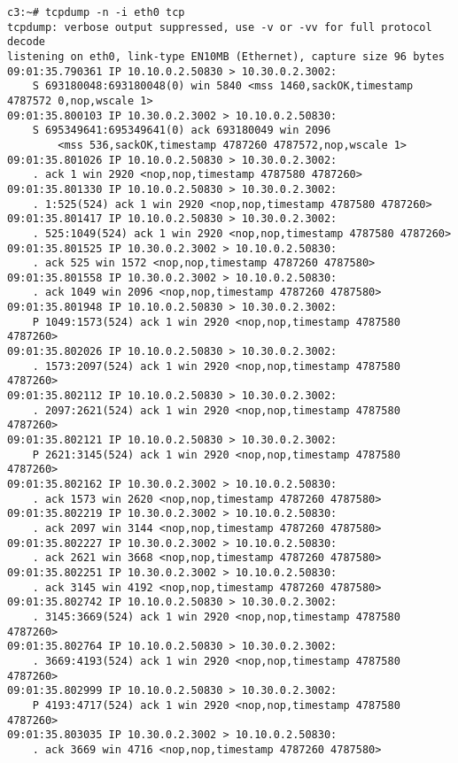 \documentclass[a4paper,12pt]{article}
\begin{document}
\begin{Verbatim}
c3:~# tcpdump -n -i eth0 tcp
tcpdump: verbose output suppressed, use -v or -vv for full protocol decode
listening on eth0, link-type EN10MB (Ethernet), capture size 96 bytes
09:01:35.790361 IP 10.10.0.2.50830 > 10.30.0.2.3002: 
    S 693180048:693180048(0) win 5840 <mss 1460,sackOK,timestamp 4787572 0,nop,wscale 1>
09:01:35.800103 IP 10.30.0.2.3002 > 10.10.0.2.50830: 
    S 695349641:695349641(0) ack 693180049 win 2096 
        <mss 536,sackOK,timestamp 4787260 4787572,nop,wscale 1>
09:01:35.801026 IP 10.10.0.2.50830 > 10.30.0.2.3002: 
    . ack 1 win 2920 <nop,nop,timestamp 4787580 4787260>
09:01:35.801330 IP 10.10.0.2.50830 > 10.30.0.2.3002: 
    . 1:525(524) ack 1 win 2920 <nop,nop,timestamp 4787580 4787260>
09:01:35.801417 IP 10.10.0.2.50830 > 10.30.0.2.3002: 
    . 525:1049(524) ack 1 win 2920 <nop,nop,timestamp 4787580 4787260>
09:01:35.801525 IP 10.30.0.2.3002 > 10.10.0.2.50830: 
    . ack 525 win 1572 <nop,nop,timestamp 4787260 4787580>
09:01:35.801558 IP 10.30.0.2.3002 > 10.10.0.2.50830: 
    . ack 1049 win 2096 <nop,nop,timestamp 4787260 4787580>
09:01:35.801948 IP 10.10.0.2.50830 > 10.30.0.2.3002: 
    P 1049:1573(524) ack 1 win 2920 <nop,nop,timestamp 4787580 4787260>
09:01:35.802026 IP 10.10.0.2.50830 > 10.30.0.2.3002: 
    . 1573:2097(524) ack 1 win 2920 <nop,nop,timestamp 4787580 4787260>
09:01:35.802112 IP 10.10.0.2.50830 > 10.30.0.2.3002: 
    . 2097:2621(524) ack 1 win 2920 <nop,nop,timestamp 4787580 4787260>
09:01:35.802121 IP 10.10.0.2.50830 > 10.30.0.2.3002: 
    P 2621:3145(524) ack 1 win 2920 <nop,nop,timestamp 4787580 4787260>
09:01:35.802162 IP 10.30.0.2.3002 > 10.10.0.2.50830: 
    . ack 1573 win 2620 <nop,nop,timestamp 4787260 4787580>
09:01:35.802219 IP 10.30.0.2.3002 > 10.10.0.2.50830: 
    . ack 2097 win 3144 <nop,nop,timestamp 4787260 4787580>
09:01:35.802227 IP 10.30.0.2.3002 > 10.10.0.2.50830: 
    . ack 2621 win 3668 <nop,nop,timestamp 4787260 4787580>
09:01:35.802251 IP 10.30.0.2.3002 > 10.10.0.2.50830: 
    . ack 3145 win 4192 <nop,nop,timestamp 4787260 4787580>
09:01:35.802742 IP 10.10.0.2.50830 > 10.30.0.2.3002: 
    . 3145:3669(524) ack 1 win 2920 <nop,nop,timestamp 4787580 4787260>
09:01:35.802764 IP 10.10.0.2.50830 > 10.30.0.2.3002: 
    . 3669:4193(524) ack 1 win 2920 <nop,nop,timestamp 4787580 4787260>
09:01:35.802999 IP 10.10.0.2.50830 > 10.30.0.2.3002: 
    P 4193:4717(524) ack 1 win 2920 <nop,nop,timestamp 4787580 4787260>
09:01:35.803035 IP 10.30.0.2.3002 > 10.10.0.2.50830: 
    . ack 3669 win 4716 <nop,nop,timestamp 4787260 4787580>

\end{Verbatim}
\end{document}
